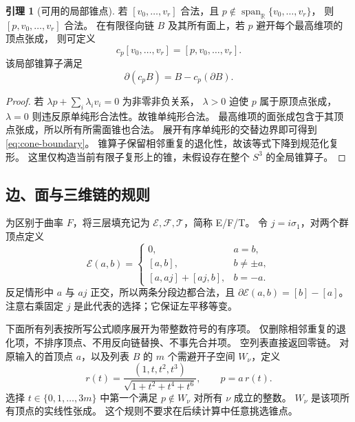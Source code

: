 \documentclass[UTF8,11pt,fontset=none]{ctexart}
\numberwithin{equation}{section}
\theoremstyle{definition}
\newtheorem{lemma}[theorem]{引理}
\DeclareMathOperator{\Span}{span}
\newcommand{\R}{\mathbb R}
\begin{document}
\begin{lemma}[可用的局部锥点]\label{lem:cone}
若 $[v_0,\ldots,v_r]$ 合法，且
$p\notin\Span_\R\{v_0,\ldots,v_r\}$，
则 $[p,v_0,\ldots,v_r]$ 合法。
在有限径向链 $B$ 及其所有面上，若 $p$ 避开每个最高维项的顶点张成，
则可定义
\[
 c_p[v_0,\ldots,v_r]=[p,v_0,\ldots,v_r].
\]
该局部锥算子满足
\begin{equation}
 \partial(c_pB)=B-c_p(\partial B).
 \label{eq:cone-boundary}
\end{equation}
\end{lemma}
\begin{proof}
若 $\lambda p+\sum_i\lambda_iv_i=0$ 为非零非负关系，
$\lambda>0$ 迫使 $p$ 属于原顶点张成，
$\lambda=0$ 则违反原单纯形合法性。故锥单纯形合法。
最高维项的面张成包含于其顶点张成，所以所有所需面锥也合法。
展开有序单纯形的交替边界即可得到 \eqref{eq:cone-boundary}。
锥算子保留相邻重复的退化性，故该等式下降到规范化复形。
这里仅构造当前有限子复形上的锥，未假设存在整个 $S^3$ 的全局锥算子。
\end{proof}

\subsection{边、面与三维链的规则}

为区别于曲率 $F$，将三层填充记为
$\mathcal E,\mathcal F,\mathcal T$，简称 E/F/T。
令 $j=i\sigma_1$，对两个群顶点定义
\begin{equation}
 \mathcal E(a,b)=
 \begin{cases}
 0,&a=b,\\
 [a,b],&b\ne\pm a,\\
 [a,aj]+[aj,b],&b=-a.
 \end{cases}
 \label{eq:E}
\end{equation}
反足情形中 $a$ 与 $aj$ 正交，所以两条分段边都合法，且
$\partial\mathcal E(a,b)=[b]-[a]$。
注意右乘固定 $j$ 是此代表的选择；它保证左平移等变。

下面所有列表按所写公式顺序展开为带整数符号的有序项。
仅删除相邻重复的退化项，不排序顶点、不用反向链替换、不事先合并项。
空列表直接返回零链。
对原输入的首顶点 $a$，以及列表 $B$ 的 $m$ 个需避开子空间 $W_\nu$，定义
\begin{equation}
 r(t)=\frac{(1,t,t^2,t^3)}{\sqrt{1+t^2+t^4+t^6}},
 \qquad p=a\,r(t).
 \label{eq:moment-curve}
\end{equation}
选择 $t\in\{0,1,\ldots,3m\}$ 中第一个满足
$p\notin W_\nu$ 对所有 $\nu$ 成立的整数。
$W_\nu$ 是该项所有顶点的实线性张成。
这个规则不要求在后续计算中任意挑选锥点。
\end{document}
